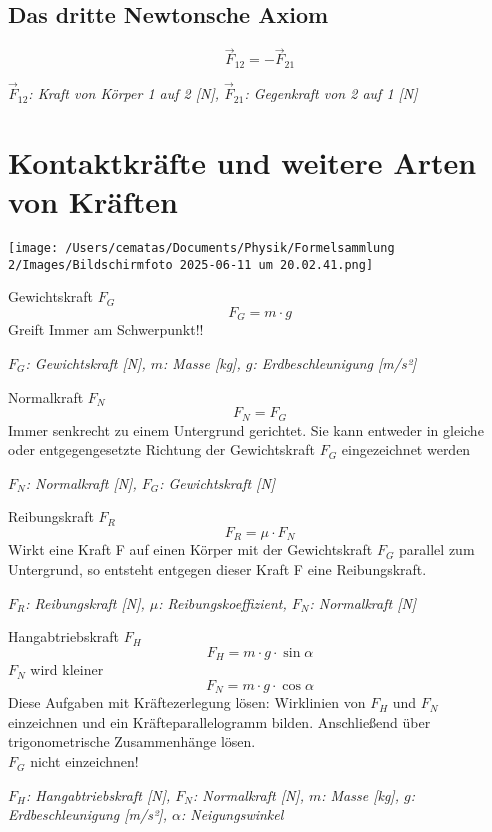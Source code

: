 \documentclass[a4paper,10pt]{article}
\newenvironment{displayformula}
{
	\begin{framed}
		\color{formulaColor}
	}
	{\end{framed}}
\newcommand{\formulalegend}[1]{%
	\par\vspace{0.5ex}%
	{{\color{legendColor}\RaggedRight\small\textit{#1}}}%
	\par\vspace{1.5ex}%
}
\begin{document}
\subsection{Das dritte Newtonsche Axiom}

\begin{displayformula}
	\[
	\vec{F}_{12} = -\vec{F}_{21}
	\]
\end{displayformula}
\formulalegend{
	\( \vec{F}_{12} \): Kraft von Körper 1 auf 2 [N], \( \vec{F}_{21} \): Gegenkraft von 2 auf 1 [N]
}



\section{Kontaktkräfte und weitere Arten von Kräften}

\texttt{[image: /Users/cematas/Documents/Physik/Formelsammlung 2/Images/Bildschirmfoto 2025-06-11 um 20.02.41.png]}
\begin{displayformula}
	Gewichtskraft \( F_G \)
	\[
	F_G = m \cdot g
	\]
	Greift Immer am Schwerpunkt!!
\end{displayformula}
\formulalegend{
	\( F_G \): Gewichtskraft [N], \( m \): Masse [kg], \( g \): Erdbeschleunigung [m/s²]
}

\begin{displayformula}
	Normalkraft \( F_N \) 
	\[
	F_N = F_G
	\]
	Immer senkrecht zu einem Untergrund gerichtet. Sie kann entweder in gleiche oder entgegengesetzte Richtung der Gewichtskraft $F_G$ eingezeichnet werden
\end{displayformula}
\formulalegend{
	\( F_N \): Normalkraft [N], \( F_G \): Gewichtskraft [N]
}

\begin{displayformula}
	Reibungskraft \( F_R \)
	\[
	F_R = \mu \cdot F_N
	\]
	Wirkt eine Kraft F auf einen Körper mit der Gewichtskraft $F_G$ parallel zum Untergrund, so entsteht entgegen dieser Kraft F eine Reibungskraft. 
\end{displayformula}
\formulalegend{
	\( F_R \): Reibungskraft [N], \( \mu \): Reibungskoeffizient, \( F_N \): Normalkraft [N]
}

\begin{displayformula}
	Hangabtriebskraft \( F_H \)
	\[
	F_H = m \cdot g \cdot \sin\alpha
	\]
	\( F_N \) wird kleiner
	\[
	F_N = m \cdot g \cdot \cos\alpha
	\]
	Diese Aufgaben mit Kräftezerlegung lösen: Wirklinien von $F_H$ und $F_N$ einzeichnen und ein Kräfteparallelogramm bilden. Anschließend über trigonometrische Zusammenhänge lösen. \\ $F_G$ nicht einzeichnen!
\end{displayformula}
\formulalegend{
	\( F_H \): Hangabtriebskraft [N], \( F_N \): Normalkraft [N], \( m \): Masse [kg], \( g \): Erdbeschleunigung [m/s²], \( \alpha \): Neigungswinkel
}
\end{document}
